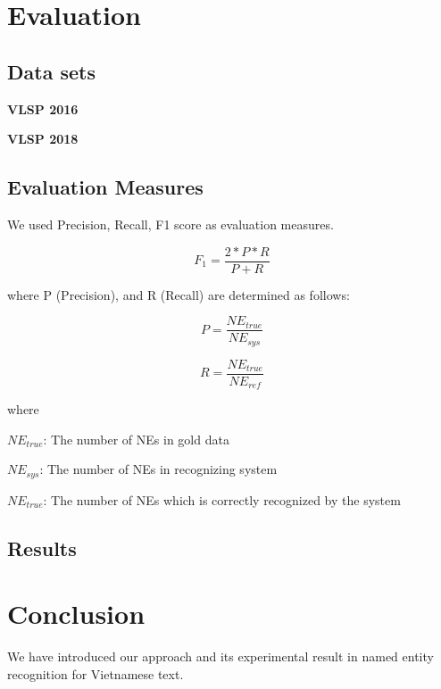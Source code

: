 \documentclass[11pt,a4paper]{article}
\begin{document}
\section{Evaluation}

\subsection{Data sets}

\noindent \textbf{VLSP 2016}


\noindent \textbf{VLSP 2018}


\subsection{Evaluation Measures}

We used Precision, Recall, F1 score as evaluation measures.

$$F_1 = \frac{2*P*R}{P + R}$$

where P (Precision), and R (Recall) are determined as follows:

$$P = \frac{{NE}_{true}}{NE_{sys}}$$

$$R = \frac{{NE}_{true}}{NE_{ref}}$$

where

$NE_{true}$: The number of NEs in gold data

$NE_{sys}$: The number of NEs in recognizing system

$NE_{true}$: The number of NEs which is correctly recognized by the system

\subsection{Results}


\section{Conclusion}

We have introduced our approach and its experimental result in named entity recognition for Vietnamese text.




\end{document}
